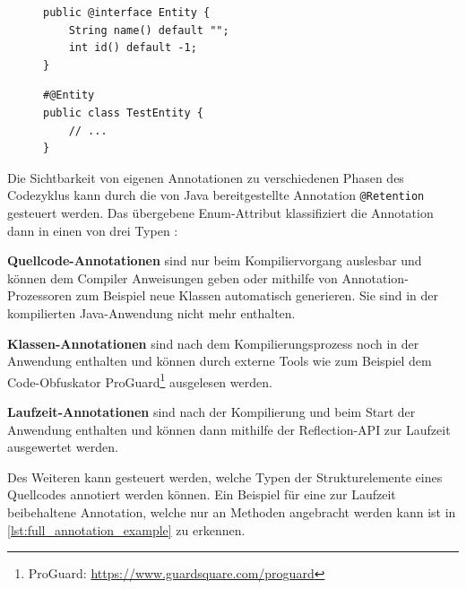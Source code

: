 \begin{description}
	\begin{figure}[H]
		\noindent
		\begin{adjustbox}{minipage=[t]{.45\linewidth},gstore totalheight=\heightone,margin=\fboxsep+\fboxrule}
			\begin{lstlisting}[caption=Deklaration -- Marker Annotation, captionpos=b, label=lst:decl_marker]
public @interface Entity {
	String name() default "";
	int id() default -1;
}
			\end{lstlisting}
		\end{adjustbox}\hfill
		\begin{adjustbox}{minipage=[t][\heightone]{0.5\linewidth}}
			\begin{lstlisting}[caption=Anwendung -- Marker Annotation, captionpos=b, label=lst:appl_marker]
#@Entity
public class TestEntity {
	// ...
}
			\end{lstlisting}
		\end{adjustbox}
	\end{figure}
\end{description}
\noindent Die Sichtbarkeit von eigenen Annotationen zu verschiedenen Phasen des Codezyklus kann durch die von Java bereitgestellte Annotation \texttt{@Retention} gesteuert werden. Das übergebene Enum-Attribut klassifiziert die Annotation dann in einen von drei Typen \cite{Rocha2011}:
\begin{description}
	\item \textbf{Quellcode-Annotationen} sind nur beim Kompiliervorgang auslesbar und können dem Compiler Anweisungen geben oder mithilfe von Annotation-Prozessoren zum Beispiel neue Klassen automatisch generieren. Sie sind in der kompilierten Java-Anwendung nicht mehr enthalten.
	\item \textbf{Klassen-Annotationen} sind nach dem Kompilierungsprozess noch in der Anwendung enthalten und können durch externe Tools wie zum Beispiel dem Code-Obfuskator ProGuard\footnote{ProGuard: \url{https://www.guardsquare.com/proguard}} ausgelesen werden.
	\item \textbf{Laufzeit-Annotationen} sind nach der Kompilierung und beim Start der Anwendung enthalten und können dann mithilfe der Reflection-API zur Laufzeit ausgewertet werden.
\end{description}
\noindent Des Weiteren kann gesteuert werden, welche Typen der Strukturelemente eines Quellcodes annotiert werden können. Ein Beispiel für eine zur Laufzeit beibehaltene Annotation, welche nur an Methoden angebracht werden kann ist in \autoref{lst:full_annotation_example} zu erkennen.
